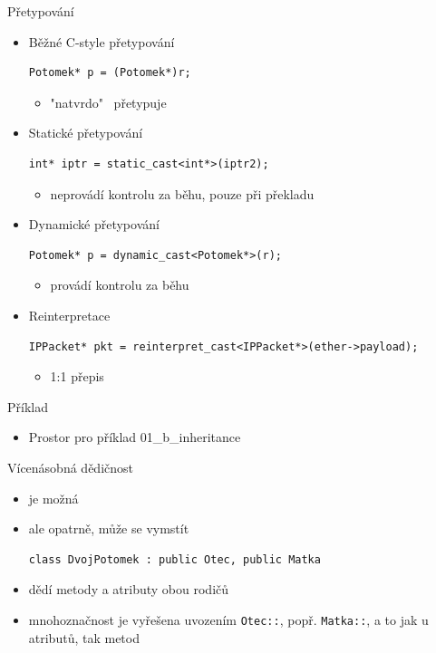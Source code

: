 \documentclass{beamer}
\begin{document}
\begin{xframe}{Přetypování}
	\begin{itemize}
		\item Běžné C-style přetypování
\begin{lstlisting}[basicstyle=\fontsize{9}{10}\selectfont\ttfamily]
Potomek* p = (Potomek*)r;
\end{lstlisting}
			\begin{itemize}
				\item "natvrdo"~ přetypuje
			\end{itemize}
		\item Statické přetypování
\begin{lstlisting}[basicstyle=\fontsize{9}{10}\selectfont\ttfamily]
int* iptr = static_cast<int*>(iptr2);
\end{lstlisting}
			\begin{itemize}
				\item neprovádí kontrolu za běhu, pouze při překladu
			\end{itemize}
		\item Dynamické přetypování
\begin{lstlisting}[basicstyle=\fontsize{9}{10}\selectfont\ttfamily]
Potomek* p = dynamic_cast<Potomek*>(r);
\end{lstlisting}
			\begin{itemize}
				\item provádí kontrolu za běhu
			\end{itemize}
		\item Reinterpretace
\begin{lstlisting}[basicstyle=\fontsize{8}{9}\selectfont\ttfamily]
IPPacket* pkt = reinterpret_cast<IPPacket*>(ether->payload);
\end{lstlisting}
			\begin{itemize}
				\item 1:1 přepis
			\end{itemize}
	\end{itemize}
\end{xframe}


\begin{xframe}{Příklad}
	\begin{itemize}
		\item Prostor pro příklad 01\_b\_inheritance		
	\end{itemize}
\end{xframe}


\begin{xframe}{Vícenásobná dědičnost}
	\begin{itemize}
		\item je možná
		\item ale opatrně, může se vymstít
\begin{lstlisting}[basicstyle=\fontsize{9}{10}\selectfont\ttfamily]
class DvojPotomek : public Otec, public Matka
\end{lstlisting}
		\item dědí metody a atributy obou rodičů
		\item mnohoznačnost je vyřešena uvozením \texttt{Otec::}, popř. \texttt{Matka::}, a to jak u atributů, tak metod
	\end{itemize}
\end{xframe}
\end{document}
